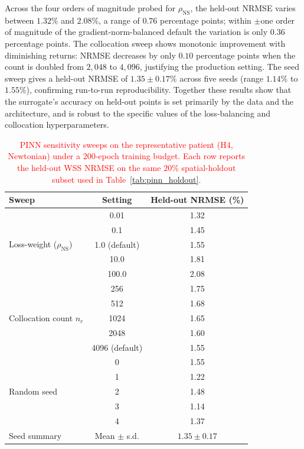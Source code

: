 ﻿\documentclass[12pt,a4paper]{article}
\newcommand{\added}[2][]{\begingroup\color{red}#2\endgroup}
\newcommand{\addp}[1]{\added{#1}}
\theoremstyle{definition}
\numberwithin{equation}{section}
\begin{document}
\addp{Across the four orders of magnitude probed for $\rho_{\mathrm{NS}}$, the held-out NRMSE varies between $1.32\%$ and $2.08\%$, a range of $0.76$ percentage points; within $\pm$one order of magnitude of the gradient-norm-balanced default the variation is only $0.36$ percentage points. The collocation sweep shows monotonic improvement with diminishing returns: NRMSE decreases by only $0.10$ percentage points when the count is doubled from $2{,}048$ to $4{,}096$, justifying the production setting. The seed sweep gives a held-out NRMSE of $1.35 \pm 0.17\%$ across five seeds (range $1.14\%$ to $1.55\%$), confirming run-to-run reproducibility. Together these results show that the surrogate's accuracy on held-out points is set primarily by the data and the architecture, and is robust to the specific values of the loss-balancing and collocation hyperparameters.}

\begin{table}[!htbp]
\color{red}
\centering
\setlength{\tabcolsep}{4pt}
\renewcommand{\arraystretch}{0.95}
\caption{\textcolor{red}{PINN sensitivity sweeps on the representative patient (H4, Newtonian) under a $200$-epoch training budget. Each row reports the held-out WSS NRMSE on the same $20\%$ spatial-holdout subset used in Table~\ref{tab:pinn_holdout}.}}
\label{tab:pinn_sensitivity}
\begin{tabular}{|l|c|c|}
\hline
\textbf{Sweep} & \textbf{Setting} & \textbf{Held-out NRMSE (\%)} \\
\hline
\multirow{5}{*}{Loss-weight ($\rho_{\mathrm{NS}}$)}
 & 0.01  & 1.32 \\
 & 0.1   & 1.45 \\
 & 1.0 (default) & 1.55 \\
 & 10.0  & 1.81 \\
 & 100.0 & 2.08 \\
\hline
\multirow{5}{*}{Collocation count $n_c$}
 & 256   & 1.75 \\
 & 512   & 1.68 \\
 & 1024  & 1.65 \\
 & 2048  & 1.60 \\
 & 4096 (default) & 1.55 \\
\hline
\multirow{5}{*}{Random seed}
 & 0 & 1.55 \\
 & 1 & 1.22 \\
 & 2 & 1.48 \\
 & 3 & 1.14 \\
 & 4 & 1.37 \\
\hline
Seed summary & Mean $\pm$ s.d. & $1.35 \pm 0.17$ \\
\hline
\end{tabular}
\end{table}
\end{document}
